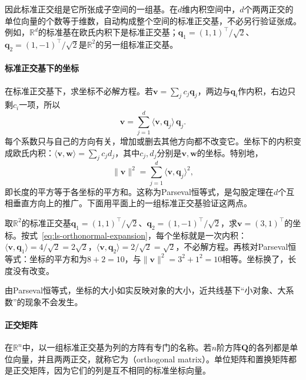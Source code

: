 因此标准正交组是它所张成子空间的一组基。在$d$维内积空间中，$d$个两两正交的单位向量的个数等于维数，自动构成整个空间的标准正交基，不必另行验证张成。例如，$\mathbb R^d$的标准基在欧氏内积下是标准正交基；$\bm q_1=(1,1)^\top/\sqrt2$、$\bm q_2=(1,-1)^\top/\sqrt2$是$\mathbb R^2$的另一组标准正交基。

\paragraph{标准正交基下的坐标}
在标准正交基下，求坐标不必解方程。若$\bm v=\sum_jc_j\bm q_j$，两边与$\bm q_i$作内积，右边只剩$c_i$一项，所以
\begin{equation}
 \bm v=\sum_{j=1}^d\langle\bm v,\bm q_j\rangle\,\bm q_j.
 \label{eq:ls-orthonormal-expansion}
\end{equation}
每个系数只与自己的方向有关，增加或删去其他方向都不改变它。坐标下的内积变成欧氏内积：$\langle\bm v,\bm w\rangle=\sum_jc_jd_j$，其中$c_j,d_j$分别是$\bm v,\bm w$的坐标。特别地，
\begin{equation}
 \lVert\bm v\rVert^2=\sum_{j=1}^d\langle\bm v,\bm q_j\rangle^2,
 \label{eq:ls-parseval}
\end{equation}
即长度的平方等于各坐标的平方和。这称为Parseval恒等式，是勾股定理在$d$个互相垂直方向上的推广。下面用平面上的一组标准正交基验证这两点。
\begin{example}[标准正交基下的坐标与Parseval恒等式]
\label{ex:ls-orthonormal-coordinates}
取$\mathbb R^2$的标准正交基$\bm q_1=(1,1)^\top/\sqrt2$、$\bm q_2=(1,-1)^\top/\sqrt2$，求$\bm v=(3,1)^\top$的坐标。按式~\eqref{eq:ls-orthonormal-expansion}，每个坐标就是一次内积：$\langle\bm v,\bm q_1\rangle=4/\sqrt2=2\sqrt2$，$\langle\bm v,\bm q_2\rangle=2/\sqrt2=\sqrt2$，不必解方程。再核对Parseval恒等式：坐标的平方和为$8+2=10$，与$\lVert\bm v\rVert^2=3^2+1^2=10$相等。坐标换了，长度没有改变。
\end{example}
由Parseval恒等式，坐标的大小如实反映对象的大小，近共线基下“小对象、大系数”的现象不会发生。

\paragraph{正交矩阵}
\label{sec:ls-orthogonal-matrices}
在$\mathbb R^n$中，以一组标准正交基为列的方阵有专门的名称。若$n$阶方阵$\bm Q$的各列都是单位向量，并且两两正交，就称它为（orthogonal matrix）。单位矩阵和置换矩阵都是正交矩阵，因为它们的列是互不相同的标准坐标向量。

